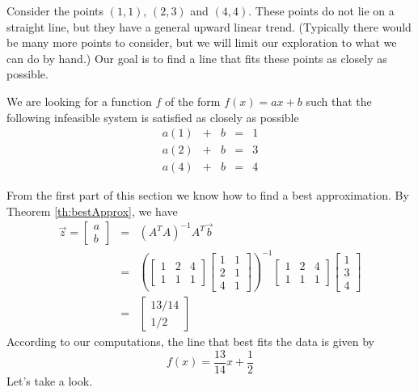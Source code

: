 \documentclass{ximera}
\begin{document}
\begin{exploration}\label{exp:leastSq2}
    Consider the points $(1,1)$, $(2, 3)$ and $(4,4)$.  These points do not lie on a straight line, but they have a general upward linear trend.  (Typically there would be many more points to consider, but we will limit our exploration to what we can do by hand.)  Our goal is to find a line that fits these points as closely as possible.  

    We are looking for a function $f$ of the form $f(x)=ax+b$ such that the following infeasible system is satisfied as closely as possible
    $$\begin{matrix}a(1)&+&b&=&1\\a(2)&+&b&=&3\\a(4)&+&b&=&4\end{matrix}$$

    From the first part of this section we know how to find a best approximation.  By Theorem \ref{th:bestApprox}, we have
    \begin{eqnarray*}
\vec{z}=\begin{bmatrix}a\\b\end{bmatrix}&=&\left(A^TA\right)^{-1}A^T\vec{b}\\
&=&\left(\begin{bmatrix}1&2&4\\1&1&1\end{bmatrix}\begin{bmatrix}
1&1\\2&1\\4&1\end{bmatrix}\right)^{-1}\begin{bmatrix}1&2&4\\1&1&1\end{bmatrix}\begin{bmatrix}
    1\\3\\4
\end{bmatrix}\\
&=&\begin{bmatrix}13/14\\1/2\end{bmatrix}
\end{eqnarray*}
According to our computations, the line that best fits the data is given by $$f(x)=\frac{13}{14}x+\frac{1}{2}$$
Let's take a look.
\begin{center}
 \end{center}


\end{exploration}
\end{document}
